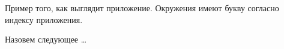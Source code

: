Пример того, как выглядит приложение. Окружения имеют букву согласно индексу приложения.
\begin{defin}
    Назовем следующее \dots
\end{defin}